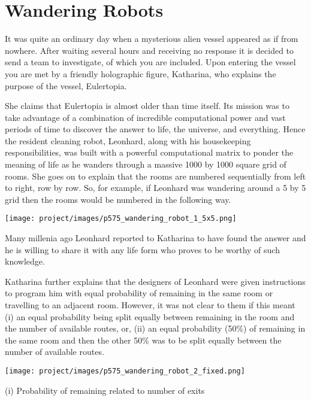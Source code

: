 \section[Problem \#575: Wandering Robots]{Wandering Robots}
\label{sec:problem_575}

It was quite an ordinary day when a mysterious alien vessel appeared as
if from nowhere. After waiting several hours and receiving no response
it is decided to send a team to investigate, of which you are included.
Upon entering the vessel you are met by a friendly holographic figure,
Katharina, who explains the purpose of the vessel, Eulertopia.

She claims that Eulertopia is almost older than time itself. Its mission
was to take advantage of a combination of incredible computational power
and vast periods of time to discover the answer to life, the universe,
and everything. Hence the resident cleaning robot, Leonhard, along with
his housekeeping responsibilities, was built with a powerful
computational matrix to ponder the meaning of life as he wanders through
a massive 1000 by 1000 square grid of rooms. She goes on to explain that
the rooms are numbered sequentially from left to right, row by row. So,
for example, if Leonhard was wandering around a 5 by 5 grid then the
rooms would be numbered in the following way.

\begin{center}
\texttt{[image: project/images/p575\_wandering\_robot\_1\_5x5.png]}
\end{center}

Many millenia ago Leonhard reported to Katharina to have found the
answer and he is willing to share it with any life form who proves to be
worthy of such knowledge.

Katharina further explains that the designers of Leonhard were given
instructions to program him with equal probability of remaining in the
same room or travelling to an adjacent room. However, it was not clear
to them if this meant (i) an equal probability being split equally
between remaining in the room and the number of available routes, or,
(ii) an equal probability (50\%) of remaining in the same room and then
the other 50\% was to be split equally between the number of available
routes.

\begin{center}
\texttt{[image: project/images/p575\_wandering\_robot\_2\_fixed.png]}
\end{center}

(i) Probability of remaining related to number of exits

